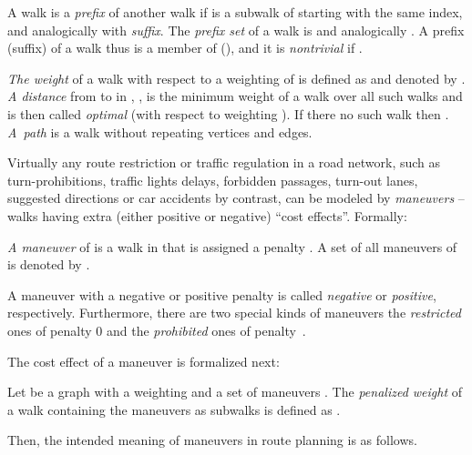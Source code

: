 \documentclass[envcountsect,envcountsame]{llncs}
\begin{document}
A walk  is a {\em prefix} of another walk  if  is a subwalk of
 starting with the same index, and analogically with {\em suffix}.
The \emph{prefix set} of a walk  is  and analogically 
. 
A prefix (suffix) of a walk  thus is a member of 
(), and it is {\em nontrivial} if .

\emph{The weight} of a walk  with respect to a weighting  of  is defined as  and 
denoted by . \emph{A distance} from  to  in , , 
is the minimum weight of a walk  over all such 
walks and  is then called \emph{optimal} (with respect to weighting ). 
If there no such walk then . \emph{A~path} is a walk 
without repeating vertices and edges.

Virtually any route restriction or traffic regulation in a road network, 
such as turn-prohibitions, traffic lights delays, forbidden passages, 
turn-out lanes, suggested directions or car accidents by contrast, can be 
modeled by \emph{maneuvers} -- walks having extra (either positive or negative) 
``cost effects''. Formally:

\begin{definition}[Maneuver]
\label{def:maneuver}
\emph{A maneuver}  of  is a walk in  that is assigned a penalty 
. A set of all maneuvers of  is 
denoted by .
\end{definition}

\begin{remark}
A maneuver with a negative or positive penalty is called \emph{negative} 
or \emph{positive}, respectively. Furthermore, there are two special kinds 
of maneuvers the \emph{restricted} ones of penalty 0 and the \emph{prohibited} 
ones of penalty~. 
\end{remark}

The cost effect of a maneuver is formalized next:
\begin{definition}
\label{def:penalized_weight}
Let  be a graph with a weighting  and a set of maneuvers . 
The \emph{penalized weight} of a walk  containing the maneuvers 
 as subwalks is defined as .
\end{definition}

Then, the intended meaning of maneuvers in route planning is as follows.
\end{document}

